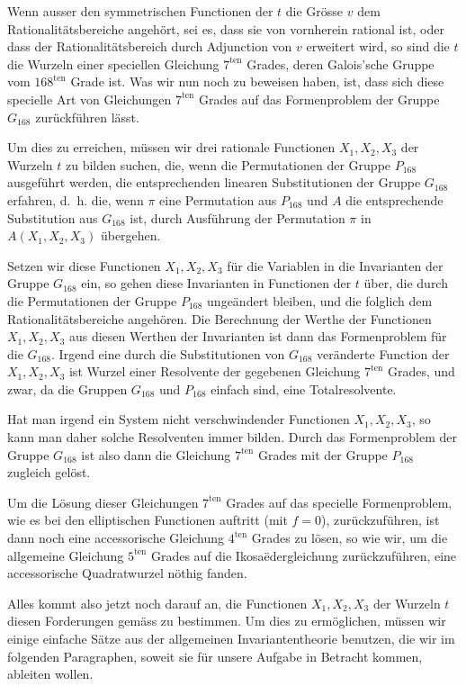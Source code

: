 \documentclass[12pt,a4paper]{article}
\begin{document}
Wenn ausser den symmetrischen Functionen der $t$ die Gr\"osse $v$ dem Rationalit\"atsbereiche angeh\"ort, sei es, dass sie von vornherein rational ist, oder dass der Rationalit\"atsbereich durch Adjunction von $v$ erweitert wird, so sind die $t$ die Wurzeln einer speciellen Gleichung $7^{\text{ten}}$ Grades, deren Galois'sche Gruppe vom $168^{\text{ten}}$ Grade ist. Was wir nun noch zu beweisen haben, ist, dass sich diese specielle Art von Gleichungen $7^{\text{ten}}$ Grades auf das Formenproblem der Gruppe $G_{168}$ zur\"uckf\"uhren l\"asst.

Um dies zu erreichen, m\"ussen wir drei rationale Functionen $X_1, X_2, X_3$ der Wurzeln $t$ zu bilden suchen, die, wenn die Permutationen der Gruppe $P_{168}$ ausgef\"uhrt werden, die entsprechenden linearen Substitutionen der Gruppe $G_{168}$ erfahren, d.~h. die, wenn $\pi$ eine Permutation aus $P_{168}$ und $A$ die entsprechende Substitution aus $G_{168}$ ist, durch Ausf\"uhrung der Permutation $\pi$ in $A(X_1, X_2, X_3)$ \"ubergehen.

Setzen wir diese Functionen $X_1, X_2, X_3$ f\"ur die Variablen in die Invarianten der Gruppe $G_{168}$ ein, so gehen diese Invarianten in Functionen der $t$ \"uber, die durch die Permutationen der Gruppe $P_{168}$ unge\"andert bleiben, und die folglich dem Rationalit\"atsbereiche angeh\"oren. Die Berechnung der Werthe der Functionen $X_1, X_2, X_3$ aus diesen Werthen der Invarianten ist dann das Formenproblem f\"ur die $G_{168}$. Irgend eine durch die Substitutionen von $G_{168}$ ver\"anderte Function der $X_1, X_2, X_3$ ist Wurzel einer Resolvente der gegebenen Gleichung $7^{\text{ten}}$ Grades, und zwar, da die Gruppen $G_{168}$ und $P_{168}$ einfach sind, eine Totalresolvente.

Hat man irgend ein System nicht verschwindender Functionen $X_1, X_2, X_3$, so kann man daher solche Resolventen immer bilden. Durch das Formenproblem der Gruppe $G_{168}$ ist also dann die Gleichung $7^{\text{ten}}$ Grades mit der Gruppe $P_{168}$ zugleich gel\"ost.

Um die L\"osung dieser Gleichungen $7^{\text{ten}}$ Grades auf das specielle Formenproblem, wie es bei den elliptischen Functionen auftritt (mit $f = 0$), zur\"uckzuf\"uhren, ist dann noch eine accessorische Gleichung $4^{\text{ten}}$ Grades zu l\"osen, so wie wir, um die allgemeine Gleichung $5^{\text{ten}}$ Grades auf die Ikosa\"edergleichung zur\"uckzuf\"uhren, eine accessorische Quadratwurzel n\"othig fanden.

Alles kommt also jetzt noch darauf an, die Functionen $X_1, X_2, X_3$ der Wurzeln $t$ diesen Forderungen gem\"ass zu bestimmen. Um dies zu erm\"oglichen, m\"ussen wir einige einfache S\"atze aus der allgemeinen Invariantentheorie benutzen, die wir im folgenden Paragraphen, soweit sie f\"ur unsere Aufgabe in Betracht kommen, ableiten wollen.
\end{document}
